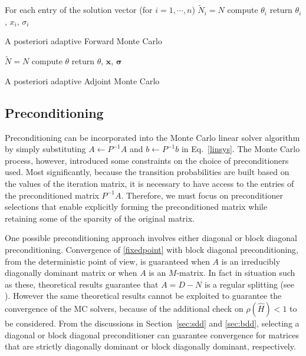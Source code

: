 \begin{algorithm}[H]
 For each entry of the solution vector (for $i=1,\cdots,n$) \;
 $\tilde{N}_i=N$\;
 compute $\theta_i$\;
 return $\theta_i$, $x_i$, $\sigma_i$\;
 \caption{A posteriori adaptive Forward Monte Carlo \label{alg:adaptive_for}}
\end{algorithm}

\begin{algorithm}[H]
 $\tilde{N}=N$\;
 compute $\theta$\;
 return $\theta$, $\mathbf{x}$, $\boldsymbol{\sigma}$\;
 \caption{A posteriori adaptive Adjoint Monte Carlo \label{alg:adaptive_adj}}
\end{algorithm}

\subsection{Preconditioning}

Preconditioning can be incorporated into the Monte Carlo linear solver
algorithm by simply substituting $A \leftarrow P^{-1}A$ and
$b \leftarrow P^{-1}b$ in Eq.~\eqref{linsys}.  The Monte Carlo process, however,
introduced some constraints on the choice of preconditioners used.  Most
significantly, because the transition probabilities are built based on the
values of the iteration matrix, it is necessary to have access to the
entries of the preconditioned matrix $P^{-1}A$.
Therefore, we must focus on preconditioner selections that enable explicitly
forming the preconditioned matrix while retaining some of the sparsity of the
original matrix.

One possible preconditioning approach involves either diagonal or block
diagonal preconditioning.  Convergence of \ref{fixedpoint} with block
diagonal preconditioning, from the
deterministic point of view, is guaranteed when $A$ is an irreducibly
diagonally dominant matrix or when $A$ is an $M$-matrix. In fact in situation
such as these, theoretical results guarantee that $A=D-N$ is a regular
splitting (see \cite{Ax1996}). However the same theoretical results cannot be
exploited to guarantee the convergence of the MC solvers, because of the
additional check on $\rho(\hat{H})<1$ to be considered.
From the discussions in Section~\ref{sec:sdd}
and \ref{sec:bdd}, selecting a diagonal or block diagonal preconditioner can
guarantee convergence for matrices that are strictly diagonally dominant
or block diagonally dominant, respectively.

